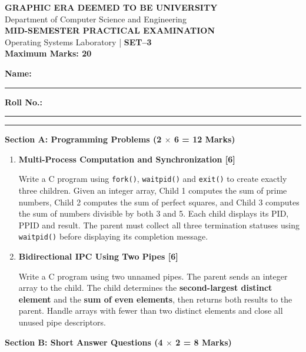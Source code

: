 \documentclass[9pt,a4paper]{extarticle}
\begin{document}
\begin{minipage}[t][0.47\textheight][t]{\textwidth}

\begin{center}
{\large\bfseries GRAPHIC ERA DEEMED TO BE UNIVERSITY}\\[-1mm]
{\small Department of Computer Science and Engineering}\\[-1mm]
{\bfseries MID-SEMESTER PRACTICAL EXAMINATION}\\[-1mm]
{\small Operating Systems Laboratory
\quad | \quad \textbf{SET--3 }}\\[-1mm]
{\small \textbf{Maximum Marks: 20}}
\end{center}

\vspace{-2mm}
\textbf{Name:} \rule{4.2cm}{0.4pt}
\hfill
\textbf{Roll No.:} \rule{3.5cm}{0.4pt}

\vspace{1mm}
\hrule
\vspace{1mm}

\textbf{Section A: Programming Problems (2 $\times$ 6 = 12 Marks)}

\begin{enumerate}[
label=\textbf{P\arabic*.},
leftmargin=6mm,
itemsep=2pt,
topsep=2pt
]

\item \textbf{Multi-Process Computation and Synchronization [6]}

Write a C program using \texttt{fork()}, \texttt{waitpid()} and
\texttt{exit()} to create exactly three children. Given an
integer array, Child 1 computes the sum of prime numbers,
Child 2 computes the sum of perfect squares, and Child 3
computes the sum of numbers divisible by both 3 and 5.
Each child displays its PID, PPID and result. The parent
must collect all three termination statuses using
\texttt{waitpid()} before displaying its completion message.

\item \textbf{Bidirectional IPC Using Two Pipes [6]}

Write a C program using two unnamed pipes. The parent sends
an integer array to the child. The child determines the
\textbf{second-largest distinct element} and the
\textbf{sum of even elements}, then returns both results
to the parent. Handle arrays with fewer than two distinct
elements and close all unused pipe descriptors.

\end{enumerate}

\vspace{1mm}
\textbf{Section B: Short Answer Questions (4 $\times$ 2 = 8 Marks)}


\end{minipage}
\end{document}

